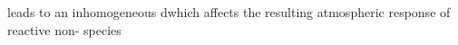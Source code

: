 leads to an inhomogeneous dwhich affects the resulting atmospheric response of reactive non- species








%
%
%

